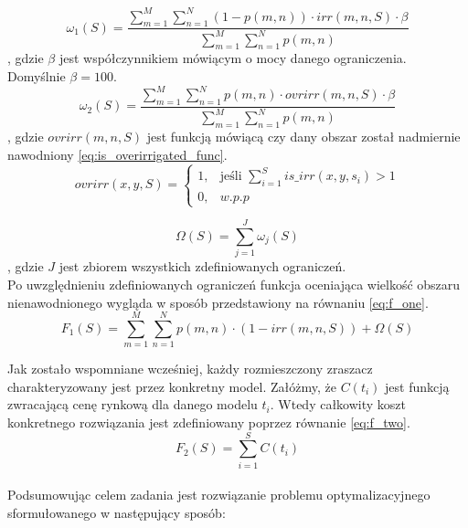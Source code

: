 \documentclass[twoside]{iisthesis}
\begin{document}
\begin{equation}\label{eq:constraint_out_of_bounds}
	\omega_{1}(S) = \dfrac{\sum_{m=1}^{M}\sum_{n=1}^{N} (1 - p(m,n)) \cdot irr(m,n,S) \cdot \beta}{\sum_{m=1}^{M}\sum_{n=1}^{N} p(m,n)}
\end{equation}
, gdzie $\beta$ jest współczynnikiem mówiącym o mocy danego ograniczenia. Domyślnie $\beta=100$.\\
\begin{equation}\label{eq:constraint_overrirr}
	\omega_{2}(S) = \dfrac{\sum_{m=1}^{M}\sum_{n=1}^{N} p(m,n) \cdot ovrirr(m,n,S) \cdot \beta}{\sum_{m=1}^{M}\sum_{n=1}^{N} p(m,n)}
\end{equation}
, gdzie $ovrirr(m,n,S)$ jest funkcją mówiącą czy dany obszar został nadmiernie nawodniony \eqref{eq:is_overirrigated_func}.\\
\begin{equation}\label{eq:is_overirrigated_func}
	ovrirr(x,y,S) = \begin{cases}
				1,& \text{jeśli } \sum_{i=1}^{S} is\_irr(x,y,s_{i}) > 1 \\
				0,& w.p.p
			   \end{cases}
\end{equation}

\begin{equation}\label{eq:constraint_sum}
	\Omega(S) = \sum_{j = 1}^{J} \omega_{j}(S)
\end{equation}
, gdzie $J$ jest zbiorem wszystkich zdefiniowanych ograniczeń.\\

Po uwzględnieniu zdefiniowanych ograniczeń funkcja oceniająca wielkość obszaru nienawodnionego wygląda w sposób przedstawiony na równaniu \eqref{eq:f_one}.
\begin{equation}\label{eq:f_one}
F_{1}(S) = \sum_{m=1}^{M}\sum_{n=1}^{N} p(m,n) \cdot (1 - irr(m,n,S)) + \Omega(S)
\end{equation}

Jak zostało wspomniane wcześniej, każdy rozmieszczony zraszacz charakteryzowany jest przez konkretny model. Załóżmy, że $C(t_{i})$ jest funkcją zwracającą cenę rynkową dla danego modelu $t_i$. Wtedy całkowity koszt konkretnego rozwiązania jest zdefiniowany poprzez równanie \eqref{eq:f_two}.
\begin{equation}\label{eq:f_two}
	F_{2}(S) = \sum_{i=1}^{S} C(t_{i})
\end{equation}\\

Podsumowując celem zadania jest rozwiązanie problemu optymalizacyjnego sformułowanego w następujący sposób:\\
\end{document}
